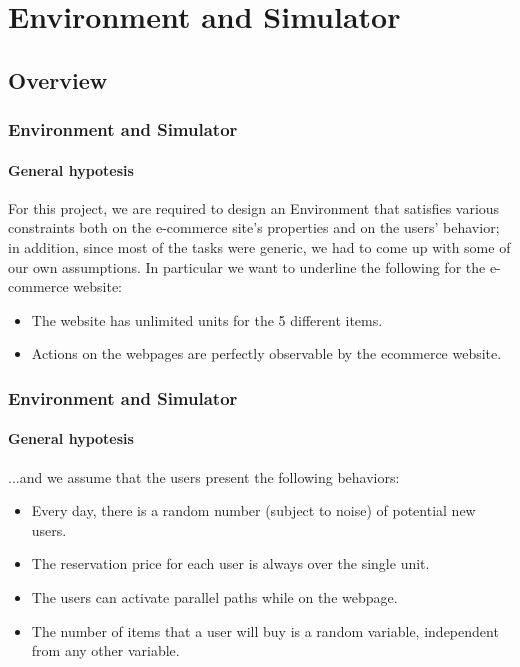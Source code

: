 \documentclass[11pt]{beamer}
\begin{document}

\section{Environment and Simulator}


\subsection{Overview}


\begin{frame}

\frametitle{Environment and Simulator}
\framesubtitle{General hypotesis}

For this project, we are required to design an Environment that satisfies various constraints both on the e-commerce site's properties and on the users' behavior; in addition, since most of the tasks were generic, we had to come up with some of our own assumptions.
In particular we want to underline the following for the e-commerce website:
\begin{itemize}[label={-}]
    \item The website has unlimited units for the 5 different items.
    \item Actions on the webpages are perfectly observable by the ecommerce website.
\end{itemize}

\end{frame}


\begin{frame}

\frametitle{Environment and Simulator}
\framesubtitle{General hypotesis}

...and we assume that the users present the following behaviors:
\begin{itemize}[label={-}]
    \item Every day, there is a random number (subject to noise) of potential new users.
    \item The reservation price for each user is always over the single unit.
    \item The users can activate parallel paths while on the webpage.
    \item The number of items that a user will buy is a random variable, independent from any other variable.
\end{itemize}


\end{frame}
\end{document}
